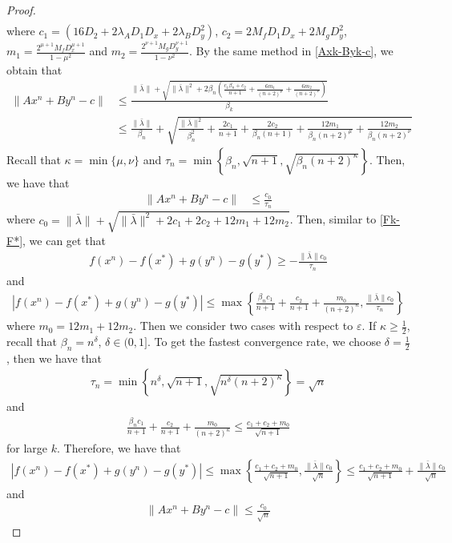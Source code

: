 \documentclass{article}
\numberwithin{equation}{section}
\begin{document}
\begin{proof}
\begin{align}
    \end{align}
    where $c_1= (16D_2+2\lambda_{A} D_1D_x+ 2\lambda_{B} D_y^2)$, $c_2=2M_fD_1D_x+2M_gD_y^2$, $m_1 =\frac{2^{\mu+1}M_fD_x^{\mu+1}}{1-\mu^2} $ and $m_2= \frac{2^{\nu+1}M_gD_y^{\nu+1}}{1-\nu^2}$. 
    By the same method in \eqref{Axk-Byk-c}, we obtain that
    \begin{align}
        \|Ax^n+By^n-c\rVert &\leq
        \frac{\|\bar{\lambda}\rVert + \sqrt{\|\bar{\lambda}\rVert^2+2\beta_n\left(\frac{c_1\beta_n+c_2}{n+1}+\frac{6m_1}{(n+2)^{\mu}}+\frac{6m_2}{(n+2)^{\nu}}\right)}}{\beta_k}  \nonumber \\
        & \leq \frac{\|\bar{\lambda}\rVert}{\beta_n}+\sqrt{\frac{\|\bar{\lambda}\rVert^2}{\beta_n^2}+\frac{2c_1}{n+1}+\frac{2c_2}{\beta_n(n+1)}+\frac{12m_1}{\beta_n(n+2)^{\mu}}+\frac{12m_2}{\beta_n(n+2)^{\nu}}} \nonumber 
    \end{align}
    Recall that $\kappa = \min\{\mu,\nu\}$ and $\tau_n = \min\left\{{\beta_n}, \sqrt{n+1},\sqrt{\beta_n(n+2)^{\kappa}}\right\}$. Then, we have that
    \begin{align}
         \|Ax^n+By^n-c\rVert & \leq \frac{c_0}{\tau_n} \label{Axk-Byk-c_holder}
    \end{align}
    where $c_0 = \|\bar{\lambda}\rVert +\sqrt{\|\bar{\lambda}\rVert^2+2c_1+2c_2+12m_1+12m_2}$. 
    Then, similar to \eqref{Fk-F*}, we can  get that 
    \begin{align}
        f(x^n) -f(x^*) + g(y^n) -g(y^*) \geq -\frac{\|\bar{\lambda}\rVert c_0}{\tau_{n}} \label{Fk-F*_holder}
    \end{align}
   and
    \begin{align}
        |f(x^n) -f(x^*) + g(y^n) -g(y^*)| \leq \max\left\{\frac{\beta_nc_1}{n+1} + \frac{c_2}{n+1}  +\frac{m_0}{(n+2)^{\kappa}}, \frac{\|\bar{\lambda}\rVert c_0}{\tau_n}\right\}
    \end{align}
    where $m_0 = 12m_1+12m_2$. Then we consider two cases with respect to $\varepsilon$.
    If $\kappa \geq \frac{1}{2}$, recall that $\beta_n = n^{\delta}$, $\delta\in (0,1]$. To get 
    the fastest convergence rate, we choose 
    $\delta = \frac{1}{2}$, then we have that
    \begin{align}
        \tau_n = \min\left\{ n^{\delta}, \sqrt{n+1}, \sqrt{n^{\delta}(n+2)^{\kappa}} \right\} =\sqrt{n} \nonumber
    \end{align}
    and
    \begin{align}
        \frac{\beta_nc_1}{n+1} + \frac{c_2}{n+1}  +\frac{m_0}{(n+2)^{\kappa}} \leq \frac{c_1+c_2+m_0}{\sqrt{n+1}} \nonumber   
    \end{align}
    for large $k$.
    Therefore, we have that
    \begin{align}
        \left|f(x^n) -f(x^*) + g(y^n) -g(y^*)\right| \leq \max\left\{\frac{c_1+c_2+m_0}{\sqrt{n+1}}, \frac{\|\bar{\lambda}\rVert c_0}{\sqrt{n}} \right\} 
        \leq \frac{c_1+c_2+m_0}{\sqrt{n+1}} + \frac{\|\bar{\lambda}\rVert c_0}{\sqrt{n}}
    \end{align}
    and
    \begin{align}
        \|Ax^n +By^n - c\rVert \leq \frac{c_0}{\sqrt{n}}
    \end{align}
    

\end{proof}
\end{document}
